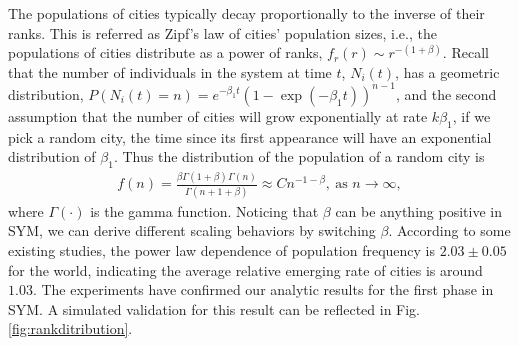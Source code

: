 \documentclass[reprint,unsortedaddress,amsmath,amssymb,aps,prl,showkeys]{revtex4-2}
\begin{document}
The populations of cities typically decay proportionally to the inverse of their ranks\cite{gabaix1999zipf's}. This is referred as Zipf's law of cities' population sizes, i.e., the populations of cities distribute as a power of ranks, $f_r(r)\sim r^{-(1+\beta)}$. Recall that the number of individuals in the system at time $t$, $N_i(t)$, has a geometric distribution\cite{durrett1999essentials}, $P(N_i(t)=n)=e^{-\beta_1t}(1-\exp(- {\beta_1} t))^{n-1}$, and the second assumption that the number of cities will grow exponentially at rate $k\beta_1$, if we pick a random city, the time since its first appearance will have an exponential distribution of $\beta_1$. Thus the distribution of the population of a random city is 
\begin{align}
	f(n)=\frac{\beta\Gamma(1+\beta)\Gamma(n)}{\Gamma(n+1+\beta)}\approx Cn^{-1-\beta}, \ \text{as } n\rightarrow\infty,
\end{align}
where $\Gamma(\cdot)$ is the gamma function. Noticing that $\beta$ can be anything positive in SYM, we can derive different scaling behaviors by switching $\beta$. According to some existing studies\cite{PhysRevLett.79.523}, the power law dependence of population frequency is $2.03\pm 0.05$ for the world, indicating the average relative emerging rate of cities is around $1.03$. The experiments have confirmed our analytic results for the first phase in SYM. A simulated validation for this result can be reflected in Fig.\@\ref{fig:rankditribution}. 
\end{document}
